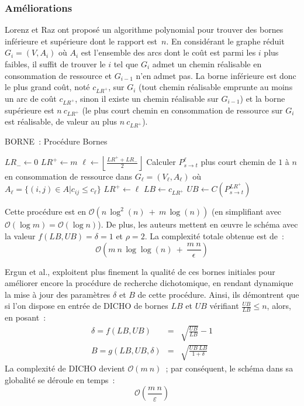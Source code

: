 \documentclass[10pt,francais]{llncs}
\begin{document}
{\subsubsection{Am\'eliorations}\label{subsub-approx-fptas-improve}
Lorenz et Raz \cite{Lorenz2001} ont propos\'e un algorithme polynomial pour trouver des bornes inf\'erieure et sup\'erieure dont le rapport est~$n$. En consid\'erant le graphe r\'eduit $G_i = (V, A_i)$ o\`u $A_i$ est l'ensemble des arcs dont le co\^ut est parmi les $i$ plus faibles, il suffit de trouver le $i$ tel que $G_i$ admet un chemin r\'ealisable en consommation de ressource et $G_{i-1}$ n'en admet pas. La borne inf\'erieure est donc le plus grand co\^ut, not\'e $c_{LR^+}$, sur $G_i$  (tout chemin r\'ealisable emprunte au moins un arc de co\^ut $c_{LR^+}$, sinon il existe un chemin r\'ealisable sur $G_{i-1}$) et la borne sup\'erieure est $n\ c_{LR^+}$ (le plus court chemin en consommation de ressource sur $G_i$ est r\'ealisable, de valeur au plus $n\ c_{LR^+}$).

\begin{algorithm}\label{algo-borne}
\caption{BORNE~: Proc\'edure Bornes}
\BlankLine
$LR_- \leftarrow 0$\;
$LR^+ \leftarrow m$\;
{
 	$\displaystyle{\ell \leftarrow \left\lfloor \frac{LR^++LR_-}{2} \right\rfloor}$\;
\BlankLine
	Calculer $P^\ell_{s\rightarrow t}$ plus court chemin de $1$ \`a $n$ en consommation de ressource dans $G_\ell = (V_\ell, A_\ell)$ o\`u $A_\ell = \{(i,j) \in A | c_{ij} \leq c_\ell\}$\;
	{
		$LR^+ \leftarrow \ell$\;
	}	
}
$LB \leftarrow c_{LR^+}$\;
\BlankLine
$UB \leftarrow C(P^{LR^+}_{s\rightarrow t})$\;
\end{algorithm}

Cette proc\'edure est en $\mathcal{O}(n\, \log^2(n)\ +\ m\, \log(n))$ (en simplifiant avec $\mathcal{O}(\log m) = \mathcal{O}(\log n)$). De plus, les auteurs mettent en \oe{}uvre le sch\'ema avec la valeur $f(LB,UB)= \delta = 1$ et $\rho = 2$. La complexit\'e totale obtenue est de~:
$$\mathcal{O}\left(m\ n\, \log\log(n)\ +\ \frac{m\ n}{\epsilon}\right)$$

Ergun et al., \cite{Ergun2002} exploitent plus finement la qualit\'e de ces bornes initiales pour am\'eliorer encore la proc\'edure de recherche dichotomique, en rendant dynamique la mise \`a jour des param\`etres $\delta$ et $B$ de cette proc\'edure. Ainsi, ils d\'emontrent que si l'on dispose en entr\'ee de DICHO de bornes $LB$ et $UB$ v\'erifiant $\displaystyle \frac{UB}{LB}\leq n$, alors, en posant~:
$$\begin{array}{lcl}
\delta = f(LB,UB) 			&= &\displaystyle\sqrt{\frac{UB}{LB}} -1\\[7pt]
B      = g(LB,UB,\delta) 	&= &\displaystyle\sqrt{\frac{UB\ LB}{1+\delta}}
\end{array}$$
La complexit\'e de DICHO devient $\mathcal{O}(m\ n)$~; par cons\'equent, le sch\'ema dans sa globalit\'e se d\'eroule en temps~:
$$\mathcal{O}\left(\frac{m\ n}{\varepsilon}\right)$$

}
\end{document}
